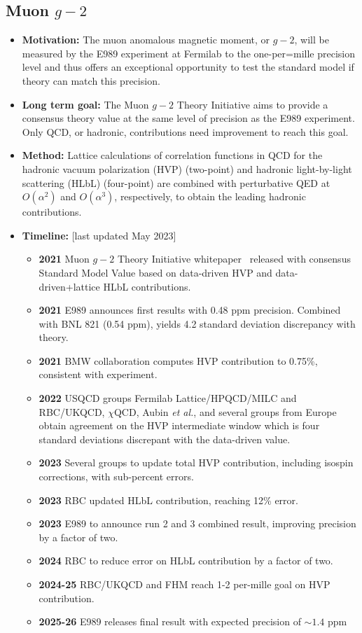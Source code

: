 \documentclass[12pt,hyperpdf]{article}
\begin{document}
\subsection{Muon $g-2$}
\begin{itemize}
    \item{\bf Motivation:} The muon anomalous magnetic moment, or
      $g-2$, will be measured by the E989 experiment at Fermilab to
      the one-per=mille precision level and thus offers an exceptional
      opportunity to test the standard model if theory can match this
      precision. 
    \item{\bf Long term goal:} The Muon $g-2$ Theory Initiative aims
      to provide a consensus theory value at the same level of
      precision as the E989 experiment. Only QCD, or hadronic,
      contributions need improvement to reach this goal.      
    \item{\bf Method:} Lattice  calculations of correlation functions
      in QCD for the hadronic vacuum polarization (HVP) (two-point)
      and hadronic light-by-light scattering (HLbL) (four-point) are
      combined with perturbative QED at $O(\alpha^2)$ and
      $O(\alpha^3)$, respectively, to obtain the leading hadronic
      contributions.  
\item{\bf Timeline:} \hfill [last updated May 2023]
\begin{itemize}
    \item{\bf 2021} Muon $g-2$ Theory Initiative whitepaper~\cite{Aoyama:2020ynm} released with consensus Standard Model Value based on data-driven HVP and data-driven+lattice HLbL contributions.
    \item{\bf 2021} E989 announces first results with 0.48 ppm precision. Combined with BNL 821 (0.54 ppm), yields 4.2 standard deviation discrepancy with theory.
    \item{\bf 2021} BMW collaboration computes HVP contribution to 0.75\%, consistent with experiment. 
    \item{\bf 2022} USQCD groups Fermilab Lattice/HPQCD/MILC and RBC/UKQCD, $\chi$QCD, Aubin {\it et al.}, and several groups from Europe obtain agreement on the HVP intermediate window which is four standard deviations discrepant with the data-driven value.
    \item{\bf 2023} Several groups to update total HVP contribution, including isospin corrections, with sub-percent errors.
    \item{\bf 2023} RBC updated HLbL contribution, reaching 12\% error.
    \item{\bf 2023} E989 to announce run 2 and 3 combined result, improving precision by a factor of two.
    \item{\bf 2024} RBC to reduce error on HLbL contribution by a factor of two.
    \item{\bf 2024-25} RBC/UKQCD and FHM reach 1-2 per-mille goal on HVP contribution. 
    \item{\bf 2025-26} E989 releases final result with expected precision of $\sim 1.4$ ppm
\end{itemize}
\end{itemize}
\end{document}
